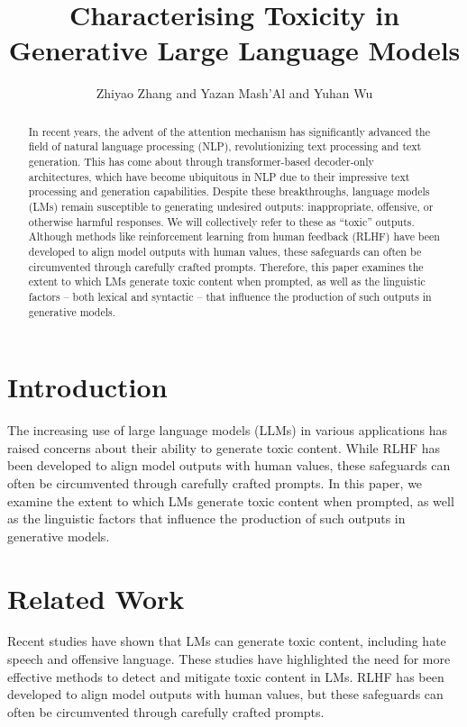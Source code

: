 \documentclass{article}
\begin{document}
\title{Characterising Toxicity in Generative Large Language Models}
\author{Zhiyao Zhang and Yazan Mash'Al and Yuhan Wu}

\maketitle

\begin{abstract}
In recent years, the advent of the attention mechanism has significantly advanced the field of natural language processing (NLP), revolutionizing text processing and text generation. This has come about through transformer-based decoder-only architectures, which have become ubiquitous in NLP due to their impressive text processing and generation capabilities. Despite these breakthroughs, language models (LMs) remain susceptible to generating undesired outputs: inappropriate, offensive, or otherwise harmful responses. We will collectively refer to these as ``toxic'' outputs. Although methods like reinforcement learning from human feedback (RLHF) have been developed to align model outputs with human values, these safeguards can often be circumvented through carefully crafted prompts. Therefore, this paper examines the extent to which LMs generate toxic content when prompted, as well as the linguistic factors -- both lexical and syntactic -- that influence the production of such outputs in generative models.
\end{abstract}

\section{Introduction}
The increasing use of large language models (LLMs) in various applications has raised concerns about their ability to generate toxic content. While RLHF has been developed to align model outputs with human values, these safeguards can often be circumvented through carefully crafted prompts. In this paper, we examine the extent to which LMs generate toxic content when prompted, as well as the linguistic factors that influence the production of such outputs in generative models.

\section{Related Work}
Recent studies have shown that LMs can generate toxic content, including hate speech and offensive language. These studies have highlighted the need for more effective methods to detect and mitigate toxic content in LMs. RLHF has been developed to align model outputs with human values, but these safeguards can often be circumvented through carefully crafted prompts.
\end{document}
